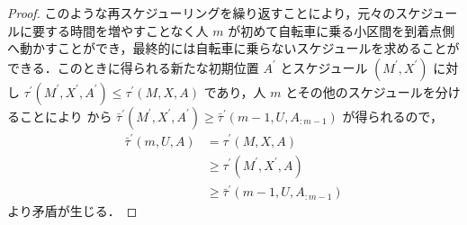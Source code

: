 \begin{proof}
  このような再スケジューリングを繰り返すことにより，元々のスケジュールに要する時間を増やすことなく人 $m$ が初めて自転車に乗る小区間を到着点側へ動かすことができ，最終的には自転車に乗らないスケジュールを求めることができる．このときに得られる新たな初期位置 $A^\prime$ とスケジュール $(M^\prime, X^\prime)$ に対し $\tau^\prime(M^\prime, X^\prime, A^\prime) \leq \tau^\prime(M, X, A)$ であり，人 $m$ とその他のスケジュールを分けることにより  から $\bar\tau^\prime(M^\prime, X^\prime, A^\prime) \geq \bar\tau^\prime(m - 1, U, A_{:m-1})$ が得られるので，
  \begin{align}
    \bar\tau^\prime(m, U, A) &= \tau^\prime(M, X, A) \\
                             & \geq \tau^\prime(M^\prime, X^\prime, A) \\
                             & \geq \bar\tau^\prime(m - 1, U, A_{:m-1})
  \end{align}
  より矛盾が生じる．





\end{proof}
